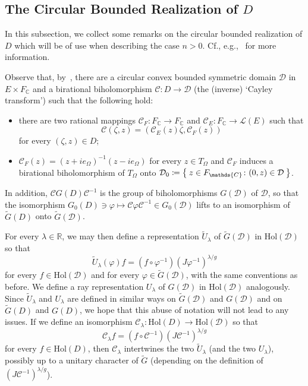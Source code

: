 \documentclass[10.5pt,reqno]{amsart}
\newcommand{\Hol}{\mathrm{Hol}}
\newcommand{\C}{\mathds{C}}
\newcommand{\R}{\mathds{R}}
\newcommand{\Cc}{\mathcal{C}}
\newcommand{\Dc}{\mathcal{D}}
\renewcommand{\phi}{\varphi}
\newcommand{\Lin}{\mathscr{L}}
\begin{document}
\subsection{The Circular Bounded Realization of $D$}\label{sec:bounded}



In this subsection, we collect some remarks on the circular bounded realization of $D$ which will be of use when describing the case $n>0$. Cf., e.g.,~\cite{FarautKoranyi2,ArazyFisher2,Arazy} for more information.

Observe that, by~\cite[Chapters 2, 10]{Loos}, there are a circular convex bounded symmetric domain $\Dc$ in $E\times F_\C$ and a birational biholomorphism $\Cc\colon D\to \Dc$ (the (inverse) `Cayley transform') such that the following hold:
\begin{itemize}
	\item there are two rational mappings $\Cc_{F}\colon F_\C\to F_\C$ and  $\Cc_E\colon F_\C\to \Lin(E)$ such that 
	\[
	\Cc(\zeta,z)=(\Cc_E(z)\zeta,\Cc_F(z))
	\]
	for every $(\zeta,z)\in D$;
	
	
	\item $\Cc_F(z)=(z+i e_\Omega)^{-1}(z-i e_\Omega)$ for every $z\in T_\Omega$ and $\Cc_F$ induces a birational biholomorphism of $T_\Omega$ onto $\Dc_0\coloneqq\Set{z\in F_\C\colon (0,z)\in \Dc}$.
\end{itemize}

In addition, $\Cc G(D) \Cc^{-1}$ is the group of biholomorphisms $G(\Dc)$ of $\Dc$, so that the isomorphism $G_0(D)\ni \phi\mapsto \Cc \phi\Cc^{-1}\in G_0(\Dc)$ lifts to an isomorphism of $\widetilde G(D)$ onto $\widetilde G(\Dc)$.

For every $\lambda\in \R$, we may then define a representation $\widetilde U_\lambda$ of $\widetilde G(\Dc)$ in $\Hol(\Dc)$ so that
\[
\widetilde U_\lambda(\phi) f=(f\circ \phi^{-1}) (J\phi^{-1})^{\lambda/g}
\]
for every $f\in \Hol(\Dc)$ and for every $\phi\in \widetilde G(\Dc)$, with the same conventions as before. We define a ray representation $U_\lambda$ of $G(\Dc)$ in $\Hol(\Dc)$ analogously. Since $\widetilde U_\lambda$ and $U_\lambda$ are defined in similar ways on $\widetilde G(\Dc)$ and $G(\Dc)$ and on $\widetilde G(D)$ and $G(D)$, we hope that this abuse of notation will not lead to any issues.
If we define an isomorphism $\Cc_\lambda\colon \Hol(D)\to \Hol(\Dc)$ so that
\[
\Cc_\lambda f= (f\circ \Cc^{-1}) (J\Cc^{-1})^{\lambda/g}
\]
for every $f\in \Hol(D)$, then $\Cc_\lambda$ intertwines the two $\widetilde U_\lambda$ (and the two $U_\lambda$), possibly up to a unitary character of $\widetilde G$ (depending on the definition of $(J\Cc^{-1})^{\lambda/g}$).
\end{document}
